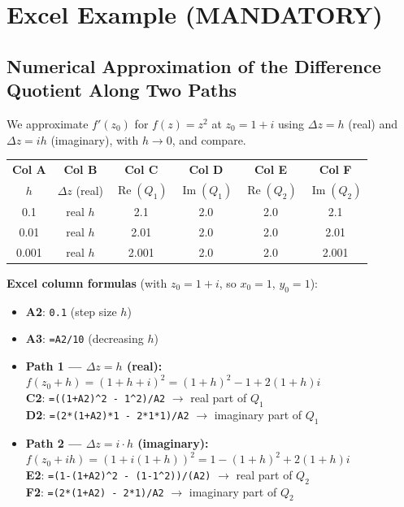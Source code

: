 \documentclass[12pt,a4paper]{article}
\begin{document}
\section{Excel Example (MANDATORY)}

\subsection*{Numerical Approximation of the Difference Quotient Along Two Paths}

We approximate $f'(z_0)$ for $f(z) = z^2$ at $z_0 = 1+i$ using
$\Delta z = h$ (real) and $\Delta z = ih$ (imaginary), with $h \to 0$, and compare.

\medskip
\begin{center}
\begin{tabular}{@{}cccccc@{}}
\toprule
\textbf{Col A} & \textbf{Col B} & \textbf{Col C} & \textbf{Col D}
               & \textbf{Col E} & \textbf{Col F} \\
$h$ & $\Delta z$ (real) & $\operatorname{Re}(Q_1)$ & $\operatorname{Im}(Q_1)$
    & $\operatorname{Re}(Q_2)$ & $\operatorname{Im}(Q_2)$ \\
\midrule
0.1  & real $h$  & 2.1 & 2.0 & 2.0 & 2.1 \\
0.01 & real $h$  & 2.01 & 2.0 & 2.0 & 2.01 \\
0.001 & real $h$ & 2.001 & 2.0 & 2.0 & 2.001 \\
\bottomrule
\end{tabular}
\end{center}

\medskip
\noindent\textbf{Excel column formulas} (with $z_0 = 1+i$, so $x_0=1$, $y_0=1$):

\begin{itemize}
  \item \textbf{A2}: \texttt{0.1} (step size $h$)
  \item \textbf{A3}: \texttt{=A2/10} (decreasing $h$)
  \item \textbf{Path 1 --- $\Delta z = h$ (real):}\\
        $f(z_0+h) = (1+h+i)^2 = (1+h)^2 - 1 + 2(1+h)i$\\
        \textbf{C2}: \texttt{=((1+A2)\^{}2 - 1\^{}2)/A2} $\to$ real part of $Q_1$\\
        \textbf{D2}: \texttt{=(2*(1+A2)*1 - 2*1*1)/A2} $\to$ imaginary part of $Q_1$
  \item \textbf{Path 2 --- $\Delta z = i\cdot h$ (imaginary):}\\
        $f(z_0+ih) = (1+i(1+h))^2 = 1-(1+h)^2 + 2(1+h)i$\\
        \textbf{E2}: \texttt{=(1-(1+A2)\^{}2 - (1-1\^{}2))/(A2)} $\to$ real part of $Q_2$\\
        \textbf{F2}: \texttt{=(2*(1+A2) - 2*1)/A2} $\to$ imaginary part of $Q_2$
\end{itemize}
\end{document}

